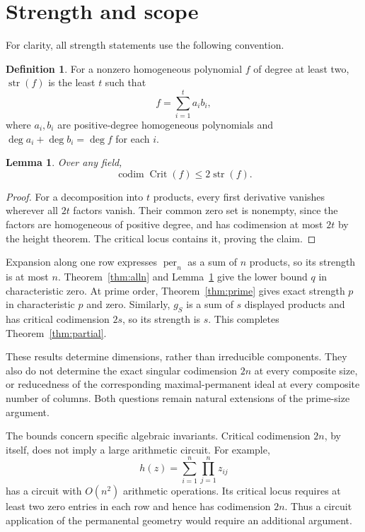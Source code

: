 \documentclass[11pt]{article}
\newtheorem{lemma}[theorem]{Lemma}
\theoremstyle{definition}\newtheorem{definition}[theorem]{Definition}
\theoremstyle{remark}\newtheorem{remark}[theorem]{Remark}
\DeclareMathOperator{\per}{per}
\DeclareMathOperator{\Crit}{Crit}
\DeclareMathOperator{\codim}{codim}
\DeclareMathOperator{\str}{str}
\numberwithin{equation}{section}
\begin{document}
\section{Strength and scope}\label{sec:strength}
For clarity, all strength statements use the following convention.

\begin{definition}
For a nonzero homogeneous polynomial $f$ of degree at least two,
$\str(f)$ is the least $t$ such that
\[
 f=\sum_{i=1}^{t}a_ib_i,
\]
where $a_i,b_i$ are positive-degree homogeneous polynomials and
$\deg a_i+\deg b_i=\deg f$ for each $i$.
\end{definition}

\begin{lemma}\label{lem:strength}
Over any field,
\[
 \codim\Crit(f)\le2\str(f).
\]
\end{lemma}
\begin{proof}
For a decomposition into $t$ products, every first derivative
vanishes wherever all $2t$ factors vanish. Their common zero set
is nonempty, since the factors are homogeneous of positive degree,
and has codimension at most $2t$ by the height theorem. The
critical locus contains it, proving the claim.
\end{proof}

Expansion along one row expresses $\per_n$ as a sum of $n$
products, so its strength is at most $n$. Theorem~\ref{thm:alln}
and Lemma~\ref{lem:strength} give the lower bound $q$ in
characteristic zero. At prime order, Theorem~\ref{thm:prime}
gives exact strength $p$ in characteristic $p$ and zero.
Similarly, $g_S$ is a sum of $s$ displayed products and has
critical codimension $2s$, so its strength is $s$. This completes
Theorem~\ref{thm:partial}.

These results determine dimensions, rather than irreducible
components. They also do not determine the exact singular
codimension $2n$ at every composite size, or reducedness of the
corresponding maximal-permanent ideal at every composite number
of columns. Both questions remain natural extensions of the
prime-size argument.

The bounds concern specific algebraic invariants. Critical
codimension $2n$, by itself, does not imply a large arithmetic
circuit. For example,
\[
 h(z)=\sum_{i=1}^{n}\prod_{j=1}^{n}z_{ij}
\]
has a circuit with $O(n^2)$ arithmetic operations. Its critical
locus requires at least two zero entries in each row and hence
has codimension $2n$. Thus a circuit application of the
permanental geometry would require an additional argument.
\end{document}
